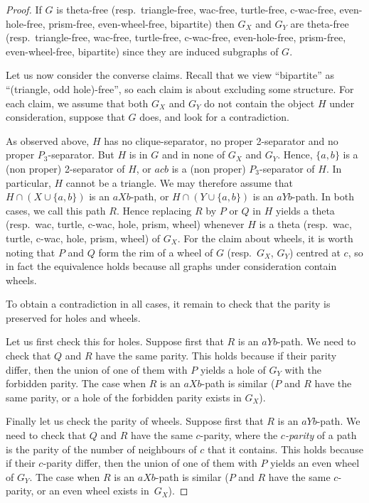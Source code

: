 \documentclass[11pt]{article}
\begin{document}
\begin{proof}
  If $G$ is theta-free (resp.\ triangle-free, wac-free, turtle-free, c-wac-free, even-hole-free, prism-free, even-wheel-free, bipartite) then $G_X$ and $G_Y$ are theta-free (resp.\ triangle-free, wac-free, turtle-free, c-wac-free, even-hole-free, prism-free, even-wheel-free, bipartite) since they are induced subgraphs of $G$.

  Let us now consider the converse claims.  Recall that we view ``bipartite'' as ``(triangle, odd hole)-free'', so each claim is about excluding some structure. For each claim, we assume that both $G_X$ and $G_Y$ do not contain the object $H$ under consideration, suppose that $G$ does, and look for a contradiction. 

  As observed above, $H$ has no clique-separator, no proper 2-separator and no proper $P_3$-separator.  But $H$ is in $G$ and in none of $G_X$ and $G_Y$.  Hence,  $\{a, b\}$ is a (non proper) 2-separator of $H$, or $acb$ is a (non proper) $P_3$-separator of $H$. In particular, $H$ cannot be a triangle.  We may therefore assume that $H\cap (X\cup \{a, b\})$ is an $aXb$-path, or $H\cap (Y\cup \{a, b\})$ is an $aYb$-path. In both cases, we call this path $R$. Hence replacing $R$ by $P$ or $Q$ in $H$ yields a theta (resp.\ wac, turtle, c-wac, hole, prism, wheel) whenever $H$ is a theta (resp.\ wac, turtle, c-wac, hole, prism, wheel) of $G_X$.  For the claim about wheels, it is worth noting that $P$ and $Q$ form the rim of a wheel of $G$ (resp.\ $G_X$, $G_Y$) centred at $c$, so in fact the equivalence holds because all graphs under consideration contain wheels.  
  
  To obtain a contradiction in all cases, it remain to check that the parity is preserved for holes and wheels. 
  
  Let us first check this for holes. Suppose first that $R$ is an $aYb$-path. We need to check  that $Q$ and $R$ have the same parity.  This holds because if their parity differ, then the union of one of them with $P$ yields a hole of $G_Y$ with the forbidden parity. The case when  $R$ is an $aXb$-path is similar ($P$ and $R$ have the same parity, or a hole of the forbidden parity exists in $G_X$).
  
  Finally let us check the parity of wheels. Suppose first that $R$ is an $aYb$-path. We need to check  that $Q$ and $R$ have the same $c$-parity, where the \emph{$c$-parity} of a path is the parity of the number of neighbours of $c$ that it contains.  This holds because if their $c$-parity differ, then the union of one of them with $P$ yields an even wheel of $G_Y$. The case when  $R$ is an $aXb$-path is similar ($P$ and $R$ have the same $c$-parity, or an even wheel exists in~$G_X$).
\end{proof}
\end{document}
